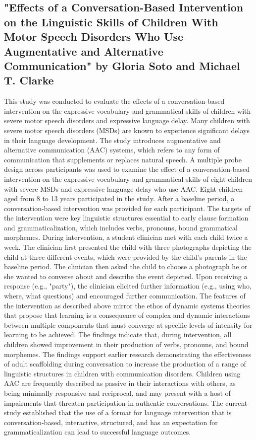 \documentclass[sigchi]{acmart}
\begin{document}
		\subsection{"Effects of a Conversation-Based Intervention on the Linguistic Skills of Children With Motor Speech Disorders Who Use Augmentative and Alternative Communication" by Gloria Soto and Michael T. Clarke}
			This study was conducted to evaluate the effects of a conversation-based intervention on the expressive vocabulary and grammatical skills of children with severe motor speech disorders and expressive language delay. Many children with severe motor speech disorders (MSDs) are known to experience significant delays in their language development. The study introduces augmentative and alternative communication (AAC) systems, which refers to any form of communication that supplements or replaces natural speech. A multiple probe design across participants was used to examine the effect of a conversation-based intervention on the expressive vocabulary and grammatical skills of eight children with severe MSDs and expressive language delay who use AAC. Eight children aged from 8 to 13 years participated in the study. After a baseline period, a conversation-based intervention was provided for each participant. The targets of the intervention were key linguistic structures essential to early clause formation and grammaticalization, which includes verbs, pronouns, bound grammatical morphemes. During intervention, a student clinician met with each child twice a week. The clinician first presented the child with three photographs depicting the child at three different events, which were provided by the child's parents in the baseline period. The clinician then asked the child to choose a photograph he or she wanted to converse about and describe the event depicted. Upon receiving a response (e.g., "party"), the clinician elicited further information (e.g., using who, where, what questions) and encouraged further communication. The features of the intervention as described above mirror the ethos of dynamic systems theories that propose that learning is a consequence of complex and dynamic interactions between multiple components that must converge at specific levels of intensity for learning to be achieved.
			The findings indicate that, during intervention, all children showed improvement in their production of verbs, pronouns, and bound morphemes. The findings support earlier research demonstrating the effectiveness of adult scaffolding during conversation to increase the production of a range of linguistic structures in children with communication disorders. Children using AAC are frequently described as passive in their interactions with others, as being minimally responsive and reciprocal, and may present with a host of impairments that threaten participation in authentic conversations. The current study established that the use of a format for language intervention that is conversation-based, interactive, structured, and has an expectation for grammaticalization can lead to successful language outcomes.
\end{document}
